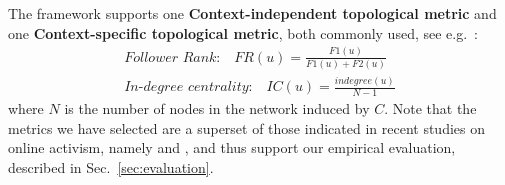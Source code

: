 The framework supports one \textbf{Context-independent topological metric} and one \textbf{Context-specific topological metric}, both commonly used, see e.g.~\cite{RIQUELME2016949}:
\begin{align}
\textit{Follower Rank:}  \quad \mathit{FR}(u) = \frac{\mathit{F1}(u)}{\mathit{F1}(u)+\mathit{F2}(u)}   \label{eq:FR}\\
\textit{In-degree centrality:} \quad \mathit{IC}(u) = \frac{\mathit{indegree}(u)}{N-1}  \label{eq:IDC}
\end{align}
where $N$ is the number of nodes in the network induced by $C$.
%
Note that the metrics we have selected are a superset of those indicated in recent studies on online activism, namely \cite{IJoC1246} and \cite{Poell2014}, and thus support our empirical evaluation, described in Sec.~\ref{sec:evaluation}.

